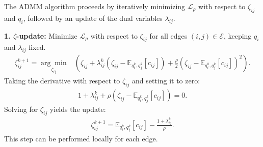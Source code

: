 The ADMM algorithm proceeds by iteratively minimizing ${\mathcal{L}}_{\rho}$ with respect to $\zeta_{ij}$ and $q_i$, followed by an update of the dual variables $\lambda_{ij}$.

\textbf{1. $\zeta$-update:} Minimize ${\mathcal{L}}_{\rho}$ with respect to $\zeta_{ij}$ for all edges $(i,j) \in {\mathcal{E}}$, keeping $q_i$ and $\lambda_{ij}$ fixed.
\begin{equation}
\begin{aligned}
\zeta_{ij}^{k+1} = \underset{\zeta_{ij}}{\arg\min} & \left( \zeta_{ij} + \lambda_{ij}^k (\zeta_{ij} - \mathbb{E}_{q_i^k, q_j^k}[c_{ij}]) + \frac{\rho}{2} (\zeta_{ij} - \mathbb{E}_{q_i^k, q_j^k}[c_{ij}])^2 \right).
\label{eq:admm_zeta_update_min}
\end{aligned}
\end{equation}
Taking the derivative with respect to $\zeta_{ij}$ and setting it to zero:
\begin{equation}
\begin{aligned}
1 + \lambda_{ij}^k + \rho (\zeta_{ij} - \mathbb{E}_{q_i^k, q_j^k}[c_{ij}]) = 0.
\label{eq:admm_zeta_deriv}
\end{aligned}
\end{equation}
Solving for $\zeta_{ij}$ yields the update:
\begin{equation}
\begin{aligned}
\zeta_{ij}^{k+1} = \mathbb{E}_{q_i^k, q_j^k}[c_{ij}] - \frac{1 + \lambda_{ij}^k}{\rho}.
\label{eq:admm_zeta_update}
\end{aligned}
\end{equation}
This step can be performed locally for each edge.

